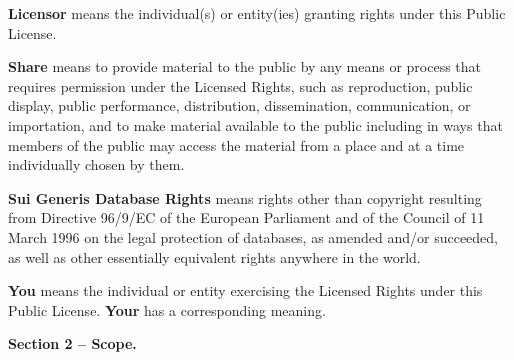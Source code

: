 \begin{doclicense@enumerate}
\item \textbf{Licensor} means the individual(s) or entity(ies) granting rights under this Public License.
\item \textbf{Share} means to provide material to the public by any means or process that requires permission under the Licensed Rights, such as reproduction, public display, public performance, distribution, dissemination, communication, or importation, and to make material available to the public including in ways that members of the public may access the material from a place and at a time individually chosen by them.
\item \textbf{Sui Generis Database Rights} means rights other than copyright resulting from Directive 96/9/EC of the European Parliament and of the Council of 11 March 1996 on the legal protection of databases, as amended and/or succeeded, as well as other essentially equivalent rights anywhere in the world.
\item \textbf{You} means the individual or entity exercising the Licensed Rights under this Public License. \textbf{Your} has a corresponding meaning.
\end{doclicense@enumerate}
\par \textbf{Section 2 – Scope.}
